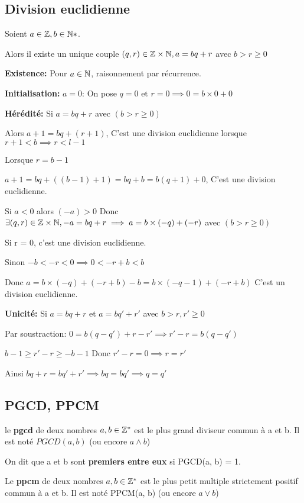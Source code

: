 \documentclass[a4paper, 12pt]{article}
\begin{document}
\subsection{Division euclidienne}

\begin{theorem}
    Soient $a \in \mathbb{Z}, b \in \mathbb{N}*$.
    
    Alors il existe un unique couple $(q, r) \in \mathbb{Z} \times \mathbb{N}, a = bq + r$ avec $b \gt r \geq 0$
\end{theorem}

\begin{demonstration}
    \textbf{Existence:} Pour $a \in \mathbb{N}$, raisonnement par récurrence.

    \textbf{Initialisation:} $a = 0$: On pose $q = 0 \text{ et } r = 0 \implies 0 = b \times 0 + 0$

    \textbf{Hérédité:} Si $a = bq + r$ avec $(b \gt r \geq 0)$

    Alors $a + 1 = bq + (r + 1)$, C'est une division euclidienne lorsque $r+1 \lt b \implies r \lt l - 1$

    Lorsque $r = b-1$

    $a + 1 = bq + ((b - 1) + 1) = bq + b = b(q + 1) + 0$,
    C'est une division euclidienne.

    Si $a \lt 0$ alors $(-a) \gt 0$ Donc $\exists (q, r) \in \mathbb{Z} \times \mathbb{N}, -a = bq + r \implies a = b \times (-q) + (-r)$ avec $(b \gt r \geq 0)$

    Si r = 0, c'est une division euclidienne.

    Sinon $-b \lt -r \lt 0 \implies 0 \lt -r + b \lt b$

    Donc $a = b \times (-q) + (-r + b) - b = b \times (-q - 1) + (-r + b)$
    C'est un division euclidienne.

    \textbf{Unicité:} Si $a = bq + r$ et $a = bq' + r'$ avec $b \gt r, r' \geq 0$

    Par soustraction: $0 = b(q - q') + r - r' \implies r' - r = b(q - q')$

    $b - 1 \geq r' - r \geq -b - 1$
    Donc $r' - r = 0 \implies r = r'$

    Ainsi $bq + r = bq' + r' \implies bq = bq' \implies q = q'$
\end{demonstration}

\subsection{PGCD, PPCM}

\begin{definition}
    le \textbf{pgcd} de deux nombres $a, b \in \mathbb{Z}^*$ est le plus grand diviseur commun à a et b. Il est noté $PGCD(a, b)$ (ou encore $a \land b$)

    On dit que a et b sont \textbf{premiers entre eux} si PGCD(a, b) = 1.

    Le \textbf{ppcm} de deux nombres $a, b \in \mathbb{Z}^*$ est le plus petit multiple strictement positif commun à a et b. Il est noté PPCM(a, b) (ou encore $a \lor b$)
\end{definition}
\end{document}
